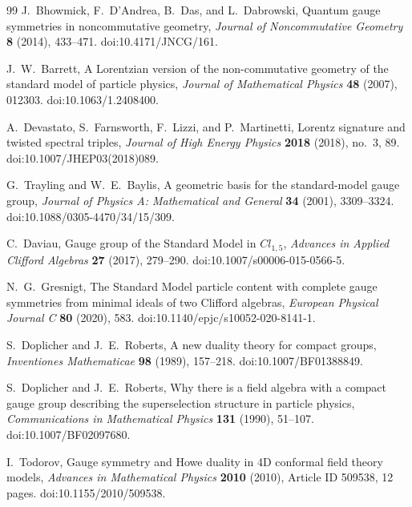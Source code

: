 \documentclass[11pt]{article}
\theoremstyle{definition}
\theoremstyle{remark}
\begin{document}
\begin{thebibliography}{99}
J.~Bhowmick, F.~D'Andrea, B.~Das, and L.~Dabrowski,
\newblock Quantum gauge symmetries in noncommutative geometry,
\newblock \emph{Journal of Noncommutative Geometry} \textbf{8} (2014),
433--471.
\newblock doi:10.4171/JNCG/161.

J.~W.~Barrett,
\newblock A Lorentzian version of the non-commutative geometry of the standard
model of particle physics,
\newblock \emph{Journal of Mathematical Physics} \textbf{48} (2007), 012303.
\newblock doi:10.1063/1.2408400.

A.~Devastato, S.~Farnsworth, F.~Lizzi, and P.~Martinetti,
\newblock Lorentz signature and twisted spectral triples,
\newblock \emph{Journal of High Energy Physics} \textbf{2018} (2018),
no.~3, 89.
\newblock doi:10.1007/JHEP03(2018)089.

G.~Trayling and W.~E.~Baylis,
\newblock A geometric basis for the standard-model gauge group,
\newblock \emph{Journal of Physics A: Mathematical and General} \textbf{34} (2001),
3309--3324.
\newblock doi:10.1088/0305-4470/34/15/309.

C.~Daviau,
\newblock Gauge group of the Standard Model in $Cl_{1,5}$,
\newblock \emph{Advances in Applied Clifford Algebras} \textbf{27} (2017), 279--290.
\newblock doi:10.1007/s00006-015-0566-5.

N.~G.~Gresnigt,
\newblock The Standard Model particle content with complete gauge symmetries from
minimal ideals of two Clifford algebras,
\newblock \emph{European Physical Journal C} \textbf{80} (2020), 583.
\newblock doi:10.1140/epjc/s10052-020-8141-1.

S.~Doplicher and J.~E.~Roberts,
\newblock A new duality theory for compact groups,
\newblock \emph{Inventiones Mathematicae} \textbf{98} (1989), 157--218.
\newblock doi:10.1007/BF01388849.

S.~Doplicher and J.~E.~Roberts,
\newblock Why there is a field algebra with a compact gauge group describing
the superselection structure in particle physics,
\newblock \emph{Communications in Mathematical Physics} \textbf{131} (1990),
51--107.
\newblock doi:10.1007/BF02097680.

I.~Todorov,
\newblock Gauge symmetry and Howe duality in 4D conformal field theory models,
\newblock \emph{Advances in Mathematical Physics} \textbf{2010} (2010),
Article ID 509538, 12 pages.
\newblock doi:10.1155/2010/509538.


\end{thebibliography}
\end{document}
